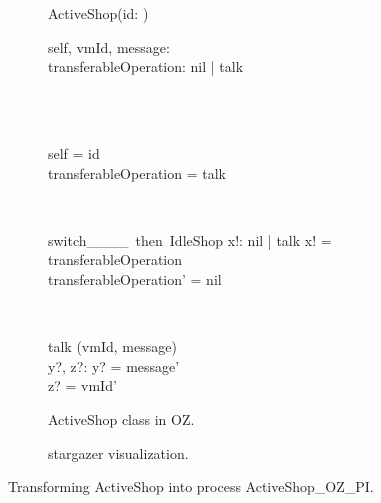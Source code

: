 \begin{figure}[H]
\begin{subfigure}{.6\textwidth}
\centering
\begin{class}{ActiveShop(id: \integer)}
\\
\begin{state}
self, vmId, message: \integer
\\transferableOperation: nil | talk
\end{state} 
\\
\begin{init}
\\self = id
\\transferableOperation = talk
\end{init} 
\\
\begin{op}{switch\_\_\_\_\ then\ IdleShop}
x!: nil | talk
\ST
x! = transferableOperation
\\transferableOperation' = nil
\end{op}
\\
\begin{op}{talk}
\Delta (vmId, message)
\\y?, z?: \integer
\ST
y? = message'
\\z? = vmId'
\end{op}
\end{class}
  \caption{ActiveShop class in OZ.}
\end{subfigure}%
\begin{subfigure}{.4\textwidth}
  \centering
{}
  \caption{stargazer visualization.}
\end{subfigure}
\caption{Transforming ActiveShop into \picalc{} process ActiveShop\_OZ\_PI.}
\label{tra_activeShop_OZ}
\end{figure}

